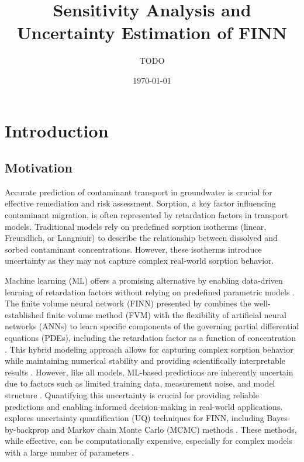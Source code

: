 \documentclass{article}
\title{Sensitivity Analysis and Uncertainty Estimation of FINN}
\author{TODO}
\date{\today}
\begin{document}
\maketitle

\begin{abstract}
\end{abstract}

\tableofcontents

\section{Introduction}

\subsection{Motivation}
Accurate prediction of contaminant transport in groundwater is crucial for effective remediation and risk assessment. Sorption, a key factor influencing contaminant migration, is often represented by retardation factors in transport models. Traditional models rely on predefined sorption isotherms (linear, Freundlich, or Langmuir) to describe the relationship between dissolved and sorbed contaminant concentrations. However, these isotherms introduce uncertainty as they may not capture complex real-world sorption behavior.

Machine learning (ML) offers a promising alternative by enabling data-driven learning of retardation factors without relying on predefined parametric models . The finite volume neural network (FINN) presented by \textcite{finn} combines the well-established finite volume method (FVM) with the flexibility of artificial neural networks (ANNs) to learn specific components of the governing partial differential equations (PDEs), including the retardation factor as a function of concentration . This hybrid modeling approach allows for capturing complex sorption behavior while maintaining numerical stability and providing scientifically interpretable results .
However, like all models, ML-based predictions are inherently uncertain due to factors such as limited training data, measurement noise, and model structure . Quantifying this uncertainty is crucial for providing reliable predictions and enabling informed decision-making in real-world applications. \textcite{finn} explores uncertainty quantification (UQ) techniques for FINN, including Bayes-by-backprop and Markov chain Monte Carlo (MCMC) methods . These methods, while effective, can be computationally expensive, especially for complex models with a large number of parameters .
\end{document}
